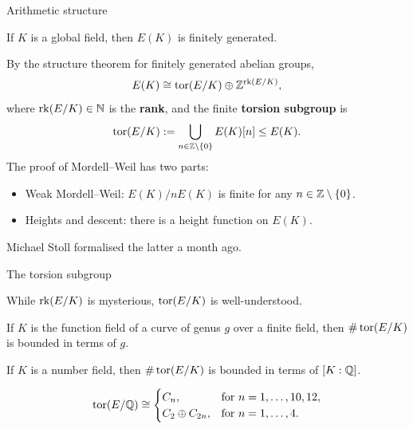 \begin{frame}{Arithmetic structure}

\begin{theorem}
If $ K $ is a global field, then $ E(K) $ is finitely generated.
\end{theorem}

By the structure theorem for finitely generated abelian groups,
$$ E(K) \cong \operatorname{tor}(E / K) \oplus \mathbb{Z}^{\operatorname{rk}(E / K)}, $$
where $ \operatorname{rk}(E / K) \in \mathbb{N} $ is the \textbf{rank}, and the finite \textbf{torsion subgroup} is
$$ \operatorname{tor}(E / K) := \bigcup_{n \in \mathbb{Z} \setminus \{0\}} E(K)[n] \le E(K). $$
The proof of Mordell--Weil has two parts:
\begin{itemize}
\item Weak Mordell--Weil: $ E(K) / nE(K) $ is finite for any $ n \in \mathbb{Z} \setminus \{0\} $.
\item Heights and descent: there is a height function on $ E(K) $.
\end{itemize}
Michael Stoll formalised the latter a month ago.

\end{frame}

\begin{frame}{The torsion subgroup}

While $ \operatorname{rk}(E / K) $ is mysterious, $ \operatorname{tor}(E / K) $ is well-understood.

\begin{theorem}[Levin, 1968]
If $ K $ is the function field of a curve of genus $ g $ over a finite field, then $ \#\operatorname{tor}(E / K) $ is bounded in terms of $ g $.
\end{theorem}

\begin{theorem}[Merel, 1996]
If $ K $ is a number field, then $ \#\operatorname{tor}(E / K) $ is bounded in terms of $ [K : \mathbb{Q}] $.
\end{theorem}

\begin{theorem}[Mazur, 1978]
$$ \operatorname{tor}(E / \mathbb{Q}) \cong
\begin{cases}
C_n, & \text{for} \ n = 1, \dots, 10, 12, \\
C_2 \oplus C_{2n}, & \text{for} \ n = 1, \dots, 4.
\end{cases}
$$
\end{theorem}

\end{frame}

